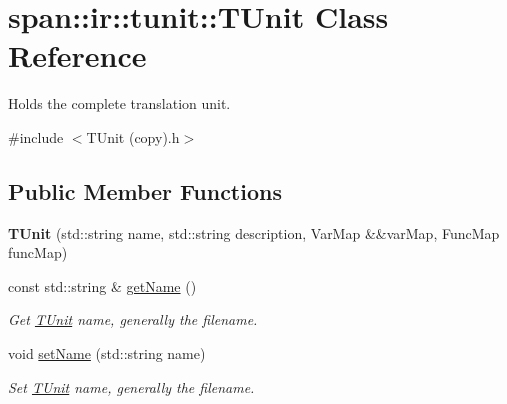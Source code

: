 \hypertarget{classspan_1_1ir_1_1tunit_1_1TUnit}{}\section{span\+:\+:ir\+:\+:tunit\+:\+:T\+Unit Class Reference}
\label{classspan_1_1ir_1_1tunit_1_1TUnit}


Holds the complete translation unit.  




{\ttfamily \#include $<$T\+Unit (copy).\+h$>$}

\subsection*{Public Member Functions}
\begin{DoxyCompactItemize}
\item 
\mbox{\label{classspan_1_1ir_1_1tunit_1_1TUnit_ad6773c50bc2aeaa86815a798ee9ca89d}} 
{\bfseries T\+Unit} (std\+::string name, std\+::string description, Var\+Map \&\&var\+Map, Func\+Map func\+Map)
\item 
\mbox{\label{classspan_1_1ir_1_1tunit_1_1TUnit_acee42872de33f4c42935d0ee30731234}} 
const std\+::string \& \hyperlink{classspan_1_1ir_1_1tunit_1_1TUnit_acee42872de33f4c42935d0ee30731234}{get\+Name} ()
\begin{DoxyCompactList}\small\item\em Get \hyperlink{classspan_1_1ir_1_1tunit_1_1TUnit}{T\+Unit} name, generally the filename. \end{DoxyCompactList}\item 
\mbox{\label{classspan_1_1ir_1_1tunit_1_1TUnit_a0376a882680243327f0b3a29a8be58c0}} 
void \hyperlink{classspan_1_1ir_1_1tunit_1_1TUnit_a0376a882680243327f0b3a29a8be58c0}{set\+Name} (std\+::string name)
\begin{DoxyCompactList}\small\item\em Set \hyperlink{classspan_1_1ir_1_1tunit_1_1TUnit}{T\+Unit} name, generally the filename. \end{DoxyCompactList}\item 
\mbox{\label{classspan_1_1ir_1_1tunit_1_1TUnit_ad896bdfde696ce84b09a21eca27ad97d}} 

\end{DoxyCompactItemize}
